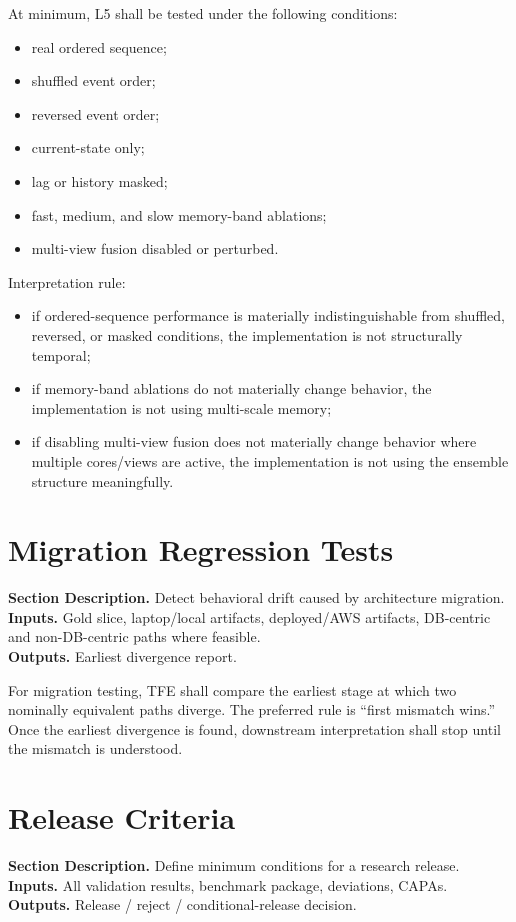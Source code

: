 \documentclass[11pt]{report}
\newcommand{\meta}[3]{\textbf{Section Description.} #1\\
\textbf{Inputs.} #2\\
\textbf{Outputs.} #3\par}
\begin{document}
At minimum, L5 shall be tested under the following conditions:
\begin{itemize}
    \item real ordered sequence;
    \item shuffled event order;
    \item reversed event order;
    \item current-state only;
    \item lag or history masked;
    \item fast, medium, and slow memory-band ablations;
    \item multi-view fusion disabled or perturbed.
\end{itemize}

Interpretation rule:
\begin{itemize}
    \item if ordered-sequence performance is materially indistinguishable from shuffled, reversed, or masked conditions, the implementation is not structurally temporal;
    \item if memory-band ablations do not materially change behavior, the implementation is not using multi-scale memory;
    \item if disabling multi-view fusion does not materially change behavior where multiple cores/views are active, the implementation is not using the ensemble structure meaningfully.
\end{itemize}

\section{Migration Regression Tests}
\meta{Detect behavioral drift caused by architecture migration.}{Gold slice, laptop/local artifacts, deployed/AWS artifacts, DB-centric and non-DB-centric paths where feasible.}{Earliest divergence report.}

For migration testing, TFE shall compare the earliest stage at which two nominally equivalent paths diverge. The preferred rule is ``first mismatch wins.'' Once the earliest divergence is found, downstream interpretation shall stop until the mismatch is understood.

\section{Release Criteria}
\meta{Define minimum conditions for a research release.}{All validation results, benchmark package, deviations, CAPAs.}{Release / reject / conditional-release decision.}
\end{document}
